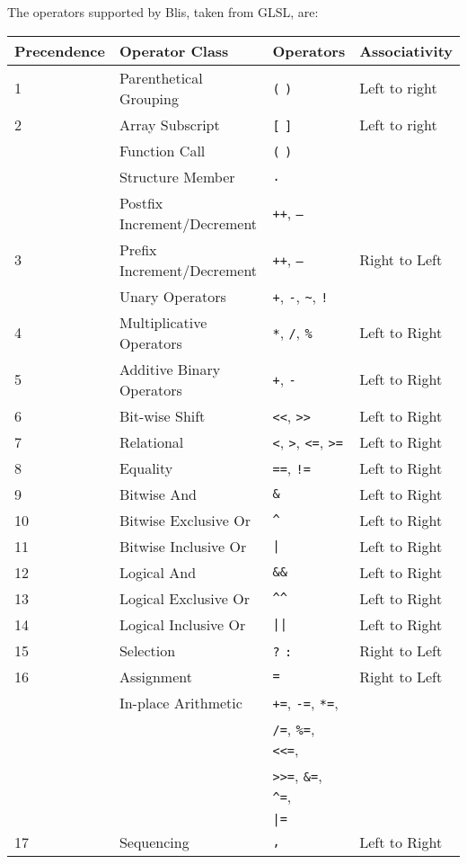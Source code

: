 \documentclass[11pt]{article}
\newcommand{\code}[1]{\texttt{#1}}
\begin{document}
The operators supported by Blis, taken from GLSL, are:

\vspace{3mm}

\begin{tabular}{| l | l | l | l |}
\hline
Precendence & Operator Class & Operators & Associativity \\ \hline
1 & Parenthetical Grouping 	& \code{(} \code{)} & Left to right \\ \hline
2 & Array Subscript & \code{[} \code{]} & Left to right \\
  & Function Call & \code{(} \code{)} & \\
  & Structure Member & \code{.} &  \\
  & Postfix Increment/Decrement & \code{++}, \code{--} & \\ \hline
3 & Prefix Increment/Decrement & \code{++}, \code{--} & Right to Left \\
  & Unary Operators & \code{+}, \code{-}, \code{\textasciitilde}, \code{!} & \\ \hline
4 & Multiplicative Operators & \code{*}, \code{/}, \code{\%} & Left to Right  \\ \hline
5 & Additive Binary Operators & \code{+}, \code{-} & Left to Right \\ \hline
6 & Bit-wise Shift & \code{<<}, \code{>>} & Left to Right \\ \hline
7 & Relational & \code{<}, \code{>}, \code{<=}, \code{>=} & Left to Right \\ \hline
8 & Equality & \code{==}, \code{!=} & Left to Right \\ \hline
9 & Bitwise And & \code{\&} & Left to Right \\ \hline
10 & Bitwise Exclusive Or & \code{\textasciicircum} & Left to Right \\ \hline
11 & Bitwise Inclusive Or & \code{|} & Left to Right \\ \hline
12 & Logical And & \code{\&\&} & Left to Right \\ \hline
13 & Logical Exclusive Or & \code{\textasciicircum\textasciicircum} & Left to Right \\ \hline
14 & Logical Inclusive Or & \code{||} & Left to Right \\ \hline
15 & Selection & \code{?} \code{:} & Right to Left \\ \hline
16 & Assignment & \code{=} & Right to Left \\
   & In-place Arithmetic & \code{+=}, \code{-=}, \code{*=}, & \\
   &                     & \code{/=}, \code{\%=}, \code{<<=}, & \\
   &                     & \code{>>=}, \code{\&=}, \code{\textasciicircum=}, & \\
   &                     & \code{|=} & \\ \hline
17 & Sequencing & \code{,} & Left to Right \\ \hline





\end{tabular}
\end{document}
